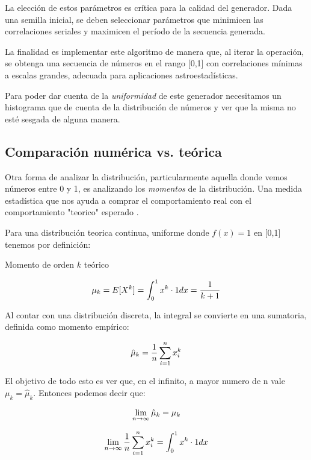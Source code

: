 \documentclass[baaa]{baaa}
\begin{document}
La elección de estos parámetros es crítica para la calidad del generador. Dada una semilla inicial, se deben seleccionar parámetros que minimicen las correlaciones seriales y maximicen el período de la secuencia generada.

La finalidad es implementar este algoritmo de manera que, al iterar la operación, se obtenga una secuencia de números en el rango [0,1] con correlaciones mínimas a escalas grandes, adecuada para aplicaciones astroestadísticas.

Para poder dar cuenta de la \textit{uniformidad} de este generador necesitamos un histograma que de cuenta de la distribución de números y ver que la misma no esté sesgada de alguna manera.

\subsection{Comparación numérica vs. teórica}

Otra forma de analizar la distribución, particularmente aquella donde vemos números entre 0 y 1, es analizando los \textit{momentos} de la distribución. Una medida estadística que nos ayuda a comprar el comportamiento real con el comportamiento "teorico" esperado \citep{gershenfeld1999nature}.

Para una distribución teorica continua, uniforme donde $f(x)=1$ en [0,1] tenemos por definición:

Momento de orden $k$ teórico

\begin{equation}
\centering
\mu_{k}=E[X^k] = \int_0^1 x^k \cdot 1  dx = \frac{1}{k+1}
\end{equation}

Al contar con una distribución discreta, la integral se convierte en una sumatoria, definida como momento empírico:

\begin{equation}
\centering
\hat{\mu}_k = \frac{1}{n} \sum_{i=1}^n x_i^k
\end{equation}

El objetivo de todo esto es ver que, en el infinito, a mayor numero de n vale $ \mu_{k} = \hat{\mu}_k$. Entonces podemos decir que:

\begin{equation}
\centering
\lim_{n \to \infty} \hat{\mu}_k = \mu_{k}
\end{equation}

\begin{equation}
\centering
\lim_{n \to \infty} \frac{1}{n} \sum_{i=1}^n x_i^k = \int_0^1 x^k \cdot 1  dx 
\end{equation}
\end{document}
